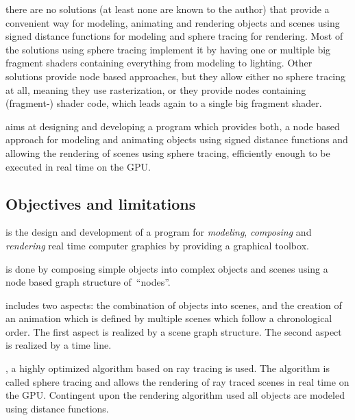 \documentclass[%
    a4paper,    %
    justified,  %
    nobib,      %
    openany     %
]{tufte-book}
\begin{document}
 there are no solutions (at least none are
known to the author) that provide a convenient way for modeling, animating and
rendering objects and scenes using signed distance functions for modeling and
sphere tracing for rendering.
Most of the solutions using sphere tracing implement it by having one or
multiple big fragment shaders containing everything from modeling to lighting.
Other solutions provide node based approaches, but they allow either no sphere
tracing at all, meaning they use rasterization, or they provide nodes containing
(fragment-) shader code, which leads again to a single big fragment shader.

 aims at designing and developing a program which
provides both, a node based approach for modeling and animating objects using
signed distance functions and allowing the rendering of scenes using sphere
tracing, efficiently enough to be executed in real time on the GPU.

\subsection{Objectives and limitations}
\label{subsec:objectives}

 is the design and development of a
program for \textit{modeling}, \textit{composing} and \textit{rendering} real
time computer graphics by providing a graphical toolbox.

 is done by composing simple objects into complex objects
and scenes using a node based graph structure of~\enquote{nodes}.

 includes two aspects: the combination of objects into
scenes, and the creation of an animation which is defined by multiple scenes
which follow a chronological order. The first aspect is realized by a scene
graph structure. The second aspect is realized by a time line.

, a highly optimized algorithm based on ray tracing is
used. The algorithm is called sphere tracing and allows the rendering of ray
traced scenes in real time on the GPU. Contingent upon the rendering algorithm
used all objects are modeled using distance functions.
\end{document}
